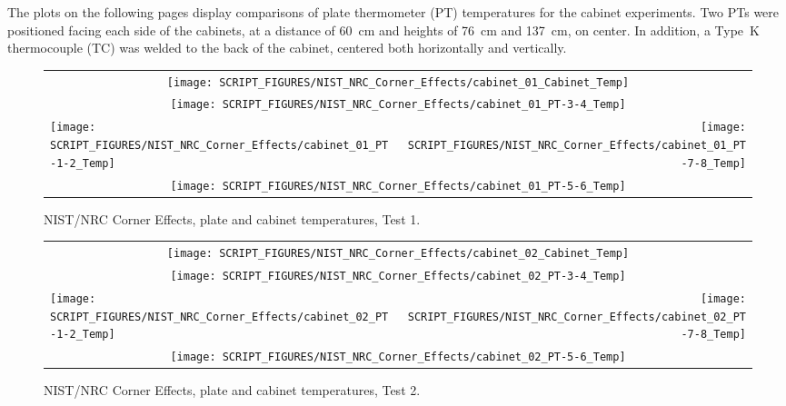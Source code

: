 The plots on the following pages display comparisons of plate thermometer (PT) temperatures for the cabinet experiments. Two PTs were positioned facing each side of the cabinets, at a distance of 60~cm and heights of 76~cm and 137~cm, on center. In addition, a Type~K thermocouple (TC) was welded to the back of the cabinet, centered both horizontally and vertically.

\newpage

\begin{figure}[p]
\begin{tabular*}{\textwidth}{l@{\extracolsep{\fill}}r}
\multicolumn{2}{c}{\texttt{[image: SCRIPT\_FIGURES/NIST\_NRC\_Corner\_Effects/cabinet\_01\_Cabinet\_Temp]}} \\
\multicolumn{2}{c}{\texttt{[image: SCRIPT\_FIGURES/NIST\_NRC\_Corner\_Effects/cabinet\_01\_PT-3-4\_Temp]}} \\
\texttt{[image: SCRIPT\_FIGURES/NIST\_NRC\_Corner\_Effects/cabinet\_01\_PT-1-2\_Temp]} &
\texttt{[image: SCRIPT\_FIGURES/NIST\_NRC\_Corner\_Effects/cabinet\_01\_PT-7-8\_Temp]} \\
\multicolumn{2}{c}{\texttt{[image: SCRIPT\_FIGURES/NIST\_NRC\_Corner\_Effects/cabinet\_01\_PT-5-6\_Temp]}}
\end{tabular*}
\caption[NIST/NRC Corner Effects, plate and cabinet temperatures, Test 1]{NIST/NRC Corner Effects, plate and cabinet temperatures, Test 1.}
\label{NIST_NRC_Cabinet_PT_Test_1}
\end{figure}

\begin{figure}[p]
\begin{tabular*}{\textwidth}{l@{\extracolsep{\fill}}r}
\multicolumn{2}{c}{\texttt{[image: SCRIPT\_FIGURES/NIST\_NRC\_Corner\_Effects/cabinet\_02\_Cabinet\_Temp]}} \\
\multicolumn{2}{c}{\texttt{[image: SCRIPT\_FIGURES/NIST\_NRC\_Corner\_Effects/cabinet\_02\_PT-3-4\_Temp]}} \\
\texttt{[image: SCRIPT\_FIGURES/NIST\_NRC\_Corner\_Effects/cabinet\_02\_PT-1-2\_Temp]} &
\texttt{[image: SCRIPT\_FIGURES/NIST\_NRC\_Corner\_Effects/cabinet\_02\_PT-7-8\_Temp]} \\
\multicolumn{2}{c}{\texttt{[image: SCRIPT\_FIGURES/NIST\_NRC\_Corner\_Effects/cabinet\_02\_PT-5-6\_Temp]}}
\end{tabular*}
\caption[NIST/NRC Corner Effects, plate and cabinet temperatures, Test 2]{NIST/NRC Corner Effects, plate and cabinet temperatures, Test 2.}
\label{NIST_NRC_Cabinet_PT_Test_2}
\end{figure}

